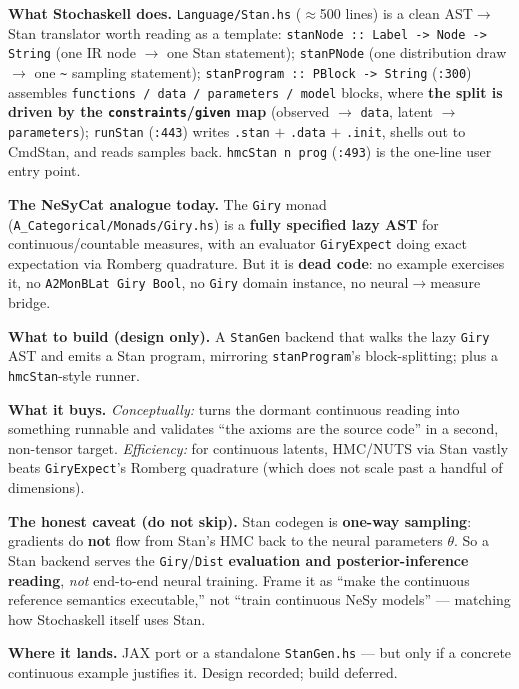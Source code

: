 \documentclass[11pt]{article}
\newcommand{\code}[1]{\texttt{#1}}
\begin{document}
\textbf{What Stochaskell does.} \code{Language/Stan.hs} ($\approx$500 lines) is a clean AST$\to$Stan
translator worth reading as a template: \code{stanNode :: Label -> Node -> String} (one IR node $\to$
one Stan statement); \code{stanPNode} (one distribution draw $\to$ one \code{\textasciitilde} sampling
statement); \code{stanProgram :: PBlock -> String} (\code{:300}) assembles \code{functions / data /
parameters / model} blocks, where \textbf{the split is driven by the \code{constraints}/\code{given}
map} (observed $\to$ \code{data}, latent $\to$ \code{parameters}); \code{runStan} (\code{:443}) writes
\code{.stan} $+$ \code{.data} $+$ \code{.init}, shells out to CmdStan, and reads samples back.
\code{hmcStan n prog} (\code{:493}) is the one-line user entry point.

\textbf{The NeSyCat analogue today.} The \code{Giry} monad (\code{A\_Categorical/Monads/Giry.hs}) is a
\textbf{fully specified lazy AST} for continuous/countable measures, with an evaluator \code{GiryExpect}
doing exact expectation via Romberg quadrature. But it is \textbf{dead code}: no example exercises it,
no \code{A2MonBLat Giry Bool}, no \code{Giry} domain instance, no neural$\to$measure bridge.

\textbf{What to build (design only).} A \code{StanGen} backend that walks the lazy \code{Giry} AST and
emits a Stan program, mirroring \code{stanProgram}'s block-splitting; plus a \code{hmcStan}-style runner.

\textbf{What it buys.} \emph{Conceptually:} turns the dormant continuous reading into something runnable
and validates ``the axioms are the source code'' in a second, non-tensor target. \emph{Efficiency:} for
continuous latents, HMC/NUTS via Stan vastly beats \code{GiryExpect}'s Romberg quadrature (which does
not scale past a handful of dimensions).

\textbf{The honest caveat (do not skip).} Stan codegen is \textbf{one-way sampling}: gradients do
\textbf{not} flow from Stan's HMC back to the neural parameters $\theta$. So a Stan backend serves the
\code{Giry}/\code{Dist} \textbf{evaluation and posterior-inference reading}, \emph{not} end-to-end
neural training. Frame it as ``make the continuous reference semantics executable,'' not ``train
continuous NeSy models'' --- matching how Stochaskell itself uses Stan.

\textbf{Where it lands.} JAX port or a standalone \code{StanGen.hs} --- but only if a concrete
continuous example justifies it. Design recorded; build deferred.
\end{document}
